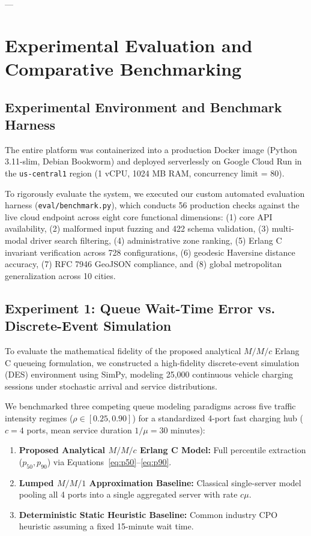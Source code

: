 \documentclass[preprint,12pt,authoryear]{elsarticle}
\begin{document}
---

\section{Experimental Evaluation and Comparative Benchmarking}
\label{sec:experiments}

\subsection{Experimental Environment and Benchmark Harness}
The entire platform was containerized into a production Docker image (Python 3.11-slim, Debian Bookworm) and deployed serverlessly on Google Cloud Run in the \texttt{us-central1} region (1 vCPU, 1024 MB RAM, concurrency limit = 80).

To rigorously evaluate the system, we executed our custom automated evaluation harness (\texttt{eval/benchmark.py}), which conducts 56 production checks against the live cloud endpoint across eight core functional dimensions: (1) core API availability, (2) malformed input fuzzing and 422 schema validation, (3) multi-modal driver search filtering, (4) administrative zone ranking, (5) Erlang C invariant verification across 728 configurations, (6) geodesic Haversine distance accuracy, (7) RFC 7946 GeoJSON compliance, and (8) global metropolitan generalization across 10 cities.

\subsection{Experiment 1: Queue Wait-Time Error vs. Discrete-Event Simulation}
To evaluate the mathematical fidelity of the proposed analytical $M/M/c$ Erlang C queueing formulation, we constructed a high-fidelity discrete-event simulation (DES) environment using SimPy, modeling 25,000 continuous vehicle charging sessions under stochastic arrival and service distributions.

We benchmarked three competing queue modeling paradigms across five traffic intensity regimes ($\rho \in [0.25, 0.90]$) for a standardized 4-port fast charging hub ($c = 4$ ports, mean service duration $1/\mu = 30\text{ minutes}$):
\begin{enumerate}
    \item \textbf{Proposed Analytical $M/M/c$ Erlang C Model:} Full percentile extraction ($p_{50}, p_{90}$) via Equations~\eqref{eq:p50}--\eqref{eq:p90}.
    \item \textbf{Lumped $M/M/1$ Approximation Baseline:} Classical single-server model pooling all 4 ports into a single aggregated server with rate $c\mu$.
    \item \textbf{Deterministic Static Heuristic Baseline:} Common industry CPO heuristic assuming a fixed 15-minute wait time.
\end{enumerate}
\end{document}
